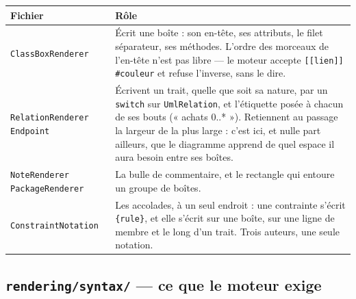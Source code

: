 \documentclass[12pt, a4paper]{article}
\begin{document}
\begin{longtable}{L{4.2cm} L{10cm}}
\toprule
\textbf{Fichier} & \textbf{Rôle} \\
\midrule
\endhead
\texttt{ClassBoxRenderer} &
Écrit une boîte : son en-tête, ses attributs, le filet séparateur, ses méthodes. L'ordre des
morceaux de l'en-tête n'est pas libre — le moteur accepte \texttt{[[lien]] \#couleur} et refuse
l'inverse, sans le dire. \\
\addlinespace
\texttt{RelationRenderer} \newline \texttt{Endpoint} &
Écrivent un trait, quelle que soit sa nature, par un \texttt{switch} sur \texttt{UmlRelation}, et
l'étiquette posée à chacun de ses bouts (« achats 0..* »). Retiennent au passage la largeur de la
plus large : c'est ici, et nulle part ailleurs, que le diagramme apprend de quel espace il aura
besoin entre ses boîtes. \\
\addlinespace
\texttt{NoteRenderer} \newline \texttt{PackageRenderer} &
La bulle de commentaire, et le rectangle qui entoure un groupe de boîtes. \\
\addlinespace
\texttt{ConstraintNotation} &
Les accolades, à un seul endroit : une contrainte s'écrit \texttt{\{rule\}}, et elle s'écrit
sur une boîte, sur une ligne de membre et le long d'un trait. Trois auteurs, une seule
notation. \\
\bottomrule
\end{longtable}

\subsection{\texttt{rendering/syntax/} — ce que le moteur exige}
\end{document}
